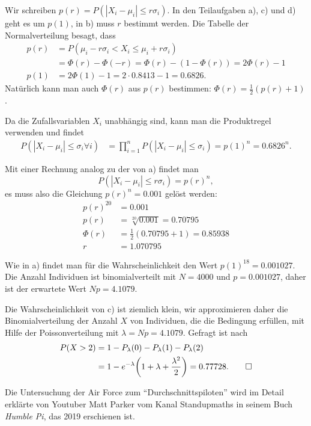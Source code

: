 \begin{loesung}
Wir schreiben $p(r)= P(|X_i-\mu_i|\le r\sigma_i)$.
In den Teilaufgaben a), c) und d) geht es um $p(1)$, in b) muss $r$ bestimmt
werden.
Die Tabelle der Normalverteilung besagt, dass
\begin{align*}
p(r)
&=
P(\mu_i-r\sigma_i < X_i \le \mu_i+r\sigma_i)
\\
&=
\Phi(r) - \Phi(-r)
=
\Phi(r) - (1-\Phi(r))
=
2\Phi(r)-1
\\
p(1)
&=
2\Phi(1)-1
=
2\cdot 0.8413 -1
=
0.6826.
\end{align*}
Natürlich kann man auch $\Phi(r)$ aus $p(r)$ bestimmen:
$\Phi(r)=\frac12(p(r)+1)$.
\begin{teilaufgaben}
\item
Da die Zufallsvariablen $X_i$ unabhängig sind, kann man die Produktregel
verwenden und findet
\begin{align*}
P(|X_i-\mu_i|\le \sigma_i\forall i)
&=
\prod_{i=1}^n P(|X_i-\mu_i|\le \sigma_i)
=
p(1)^n
=
0.6826^n.
\end{align*}
\item
Mit einer Rechnung analog zu der von a) findet man
\[
P(|X_i-\mu_i|\le r\sigma_i) =p(r)^n,
\]
es muss also die Gleichung $p(r)^n = 0.001$ gelöst werden:
\begin{align*}
p(r)^{20} &= 0.001
\\
p(r)&=\sqrt[20]{0.001} = 0.70795
\\
\Phi(r)&=\frac12(0.70795+1)=0.85938
\\
r&=1.070795
\end{align*}
\item
Wie in a) findet man für die Wahrscheinlichkeit den Wert $p(1)^{18}=0.001027$.
Die Anzahl Individuen ist binomialverteilt mit $N=4000$ und $p=0.001027$,
daher ist der erwartete Wert $Np=4.1079$.
\item
Die Wahrscheinlichkeit von c) ist ziemlich klein, wir approximieren daher
die Binomialverteilung der Anzahl $X$ von Individuen, die die Bedingung
erfüllen, mit Hilfe der Poissonverteilung mit $\lambda=Np=4.1079$.
Gefragt ist nach
\begin{align*}
P(X>2)
&=
1- P_\lambda(0)-P_\lambda(1)-P_\lambda(2)
\\
&=
1-e^{-\lambda}\biggl(1+\lambda + \frac{\lambda^2}2\biggr)
=
0.77728.
\qedhere
\end{align*}
\end{teilaufgaben}
\end{loesung}

\begin{diskussion}
Die Untersuchung der Air Force zum ``Durchschnittspiloten'' wird im Detail
erklärte von Youtuber Matt Parker vom Kanal Standupmaths in seinem Buch
{\em Humble Pi}, das 2019 erschienen ist.
\end{diskussion}

